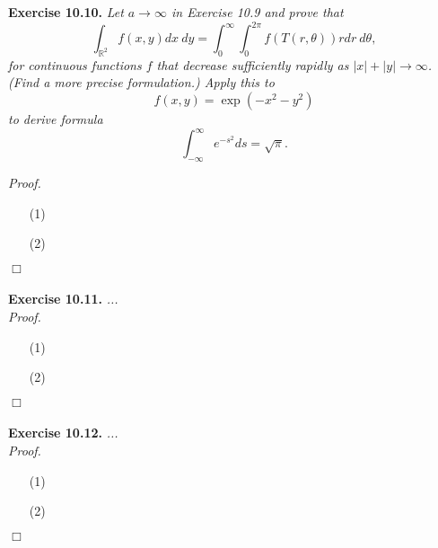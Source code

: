 \documentclass{article}
\begin{document}



\textbf{Exercise 10.10.}
\emph{Let $a \to \infty$ in Exercise 10.9 and prove that
\[
  \int_{\mathbb{R}^2} f(x,y) dx \: dy
  = \int_{0}^{\infty} \int_{0}^{2\pi} f(T(r,\theta))r dr \: d\theta,
\]
for continuous functions $f$ that decrease sufficiently rapidly
as $|x|+|y| \to \infty$.
(Find a more precise formulation.)
Apply this to
\[
  f(x,y) = \exp(-x^2-y^2)
\]
to derive formula}
\[
  \int_{-\infty}^{\infty} e^{-s^2} ds = \sqrt{\pi}.
\]



\emph{Proof.}
\begin{enumerate}
\item[(1)]
\item[(2)]

\end{enumerate}
$\Box$ \\\\






\textbf{Exercise 10.11.}
\emph{...} \\

\emph{Proof.}
\begin{enumerate}
\item[(1)]
\item[(2)]

\end{enumerate}
$\Box$ \\\\






\textbf{Exercise 10.12.}
\emph{...} \\

\emph{Proof.}
\begin{enumerate}
\item[(1)]
\item[(2)]

\end{enumerate}
$\Box$ \\\\



\end{document}
